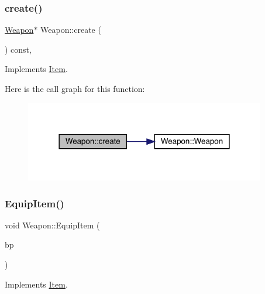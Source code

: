 \subsubsection{\texorpdfstring{create()}{create()}}
{\footnotesize\ttfamily \mbox{\hyperlink{class_weapon}{Weapon}}$\ast$ Weapon\+::create (\begin{DoxyParamCaption}{ }\end{DoxyParamCaption}) const\hspace{0.3cm}{\ttfamily [inline]}, {\ttfamily [virtual]}}



Implements \mbox{\hyperlink{class_item_a17b3fa0cef44ada961e0d3c65e1de864}{Item}}.

Here is the call graph for this function\+:\nopagebreak
\begin{figure}[H]
\begin{center}
\leavevmode
\includegraphics[width=298pt]{db/de5/class_weapon_a0755dc1352391eb484644ab4e4cf144d_cgraph}
\end{center}
\end{figure}
\mbox{\label{class_weapon_af7fda0b6e0d4ce8f25e2b0e4ad5fd94d}} 
\subsubsection{\texorpdfstring{Equip\+Item()}{EquipItem()}}
{\footnotesize\ttfamily void Weapon\+::\+Equip\+Item (\begin{DoxyParamCaption}\item[{\mbox{\hyperlink{class_body_part}{Body\+Part}} \&}]{bp }\end{DoxyParamCaption})\hspace{0.3cm}{\ttfamily [virtual]}}



Implements \mbox{\hyperlink{class_item_af4b9caf8fcfc22bbde13bf6c3505b35c}{Item}}.

